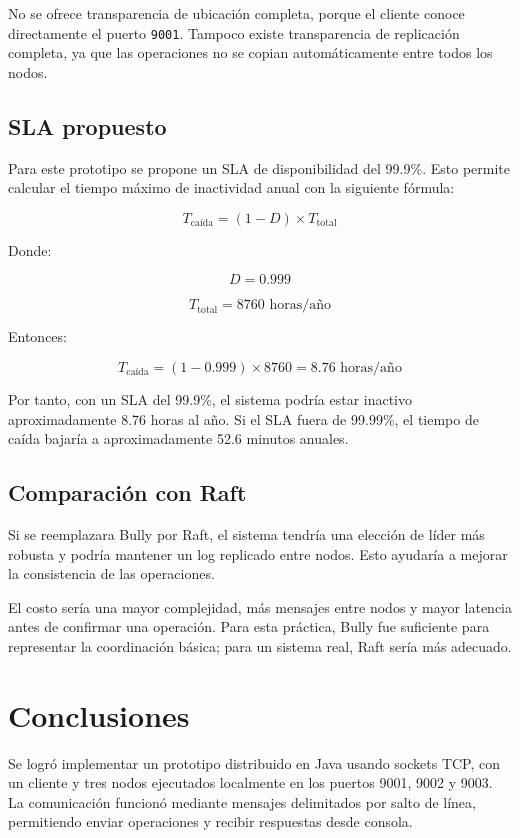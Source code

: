 \documentclass[12pt,a4paper]{article}
\begin{document}
No se ofrece transparencia de ubicación completa, porque el cliente conoce directamente el puerto \texttt{9001}. Tampoco existe transparencia de replicación completa, ya que las operaciones no se copian automáticamente entre todos los nodos.

\subsection{SLA propuesto}

Para este prototipo se propone un SLA de disponibilidad del 99.9\%. Esto permite calcular el tiempo máximo de inactividad anual con la siguiente fórmula:

\[
T_{\text{caída}} = (1 - D) \times T_{\text{total}}
\]

Donde:

\[
D = 0.999
\]

\[
T_{\text{total}} = 8760 \text{ horas/año}
\]

Entonces:

\[
T_{\text{caída}} = (1 - 0.999) \times 8760 = 8.76 \text{ horas/año}
\]

Por tanto, con un SLA del 99.9\%, el sistema podría estar inactivo aproximadamente 8.76 horas al año. Si el SLA fuera de 99.99\%, el tiempo de caída bajaría a aproximadamente 52.6 minutos anuales.

\subsection{Comparación con Raft}

Si se reemplazara Bully por Raft, el sistema tendría una elección de líder más robusta y podría mantener un log replicado entre nodos. Esto ayudaría a mejorar la consistencia de las operaciones.

El costo sería una mayor complejidad, más mensajes entre nodos y mayor latencia antes de confirmar una operación. Para esta práctica, Bully fue suficiente para representar la coordinación básica; para un sistema real, Raft sería más adecuado.

\section{Conclusiones}

Se logró implementar un prototipo distribuido en Java usando sockets TCP, con un cliente y tres nodos ejecutados localmente en los puertos 9001, 9002 y 9003. La comunicación funcionó mediante mensajes delimitados por salto de línea, permitiendo enviar operaciones y recibir respuestas desde consola.
\end{document}
